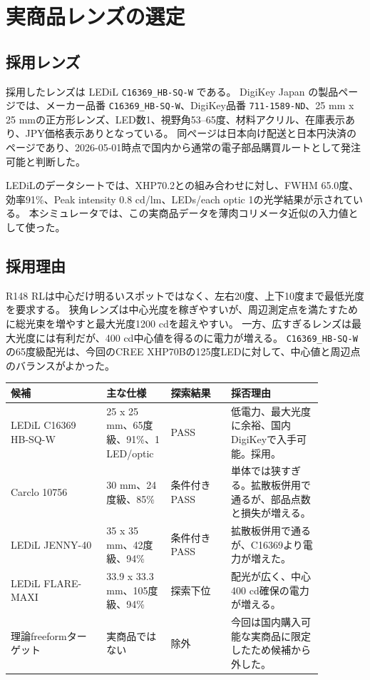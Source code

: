 \documentclass[11pt,a4paper]{article}
\newcommand{\pass}{\textcolor{green!45!black}{PASS}}
\newcommand{\code}[1]{\texttt{#1}}
\begin{document}
\section{実商品レンズの選定}
\subsection{採用レンズ}
採用したレンズは LEDiL \code{C16369\_HB-SQ-W} である。
DigiKey Japan の製品ページでは、メーカー品番 \code{C16369\_HB-SQ-W}、DigiKey品番 \code{711-1589-ND}、25 mm x 25 mmの正方形レンズ、LED数1、視野角53--65度、材料アクリル、在庫表示あり、JPY価格表示ありとなっている。
同ページは日本向け配送と日本円決済のページであり、2026-05-01時点で国内から通常の電子部品購買ルートとして発注可能と判断した。

LEDiLのデータシートでは、XHP70.2との組み合わせに対し、FWHM 65.0度、効率91\%、Peak intensity 0.8 cd/lm、LEDs/each optic 1の光学結果が示されている。
本シミュレータでは、この実商品データを薄肉コリメータ近似の入力値として使った。

\subsection{採用理由}
R148 RLは中心だけ明るいスポットではなく、左右20度、上下10度まで最低光度を要求する。
狭角レンズは中心光度を稼ぎやすいが、周辺測定点を満たすために総光束を増やすと最大光度1200 cdを超えやすい。
一方、広すぎるレンズは最大光度には有利だが、400 cd中心値を得るのに電力が増える。
\code{C16369\_HB-SQ-W} の65度級配光は、今回のCREE XHP70Bの125度LEDに対して、中心値と周辺点のバランスがよかった。

\begin{longtable}{p{0.27\linewidth}p{0.17\linewidth}p{0.17\linewidth}p{0.26\linewidth}}
\toprule
候補 & 主な仕様 & 探索結果 & 採否理由 \\
\midrule
LEDiL C16369 HB-SQ-W & 25 x 25 mm、65度級、91\%、1 LED/optic & \pass{} & 低電力、最大光度に余裕、国内DigiKeyで入手可能。採用。 \\
Carclo 10756 & 30 mm、24度級、85\% & 条件付き\pass{} & 単体では狭すぎる。拡散板併用で通るが、部品点数と損失が増える。 \\
LEDiL JENNY-40 & 35 x 35 mm、42度級、94\% & 条件付き\pass{} & 拡散板併用で通るが、C16369より電力が増えた。 \\
LEDiL FLARE-MAXI & 33.9 x 33.3 mm、105度級、94\% & 探索下位 & 配光が広く、中心400 cd確保の電力が増える。 \\
理論freeformターゲット & 実商品ではない & 除外 & 今回は国内購入可能な実商品に限定したため候補から外した。 \\
\bottomrule
\end{longtable}
\end{document}
